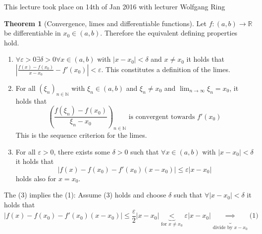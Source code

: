 \documentclass[a4paper,landscape,twocolumn]{article}
\theoremstyle{definition}
\newtheorem{theorem}{Theorem}
\newcommand\abs[1]{\left|#1\right|}
\newcommand\seq[1]{{\left(#1\right)}_{n \in \mathbb N}}
\newcommand\meta[3]{\begin{mdframed}[skipbelow=4pt,skipabove=4pt,innermargin=1pt,innerleftmargin=1pt,innerrightmargin=1pt]\begin{center}\small{\textdownarrow{} This #1 took place on #2 with lecturer #3}\end{center}\end{mdframed}}
\begin{document}
\meta{lecture}{14th of Jan 2016}{Wolfgang Ring}
%
\begin{theorem}[Convergence, limes and differentiable functions]
  Let $f: (a, b) \to \mathbb R$ be differentiable in $x_0 \in (a, b)$.
  Therefore the equivalent defining properties hold.
  \begin{enumerate}
    \item $\forall \varepsilon > 0 \exists \delta > 0 \forall x \in (a, b)$
      with $\abs{x - x_0} < \delta$ and $x \neq x_0$ it holds that
      $\abs{\frac{f(x) - f(x_0)}{x - x_0} - f'(x_0)} < \varepsilon$.
      This constitutes a definition of the limes.
    \item For all $\seq{\xi_n}$ with $\xi_n \in (a, b)$ and $\xi_n \neq x_0$
      and $\lim_{n\to\infty} \xi_n = x_0$, it holds that
      \[
        \left(\frac{f(\xi_n) - f(x_0)}{\xi_n - x_0}\right)_{n\in\mathbb N}
        \text{ is convergent towards } f'(x_0)
      \]
      This is the sequence criterion for the limes.
    \item For all $\varepsilon > 0$, there exists some $\delta > 0$ such
      that $\forall x \in (a, b)$ with $\abs{x - x_0} < \delta$ it holds that
      \[ \abs{f(x) - f(x_0) - f'(x_0)(x - x_0)} \leq \varepsilon \abs{x - x_0} \]
      holds also for $x = x_0$.
  \end{enumerate}
  The (3) implies the (1): Assume (3) holds and
  choose $\delta$ such that $\forall \abs{x - x_0} < \delta$ it holds that
  \[
    \abs{f(x) - f(x_0) - f'(x_0)(x - x_0)}
    \leq \frac\varepsilon2 \abs{x - x_0}
    \underbrace{<}_{\text{for } x \neq x_0} \varepsilon \abs{x - x_0}
    \underbrace{\implies}_{\text{divide by $x - x_0$}} \text{(1)}
  \]
\end{theorem}
\end{document}
